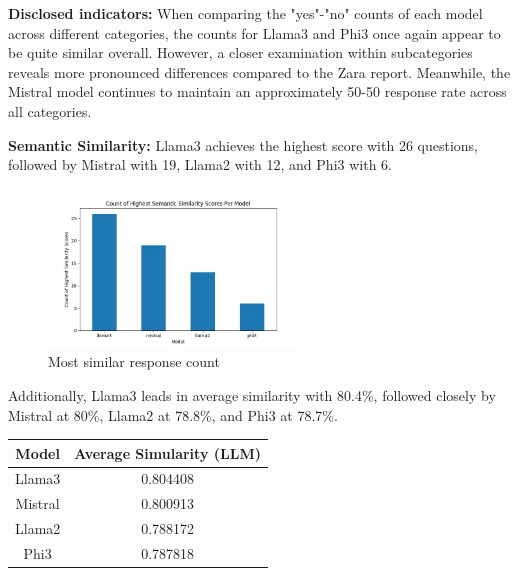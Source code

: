 \documentclass[]{article}
\begin{document}
\textbf{Disclosed indicators:} When comparing the "yes"-"no" counts of each model across different categories, 
the counts for Llama3 and Phi3 once again appear to be quite similar overall. However, 
a closer examination within subcategories reveals more pronounced differences compared to the Zara report. 
Meanwhile, the Mistral model continues to maintain an approximately 50-50 response rate across all categories.
\newline\newline

\textbf{Semantic Similarity:} 
Llama3 achieves the highest score with 26 questions, followed by Mistral with 19, Llama2 with 12, and Phi3 with 6.

\begin{figure}[H]
    \centering
    \includegraphics[width=0.6\textwidth]{./images/highest_count_hm.jpg}
    \caption{Most similar response count}
    \label{fig:image_label}
\end{figure}

Additionally, Llama3 leads in average similarity with 80.4\%, followed closely by Mistral at 80\%, Llama2 at 78.8\%, and Phi3 at 78.7\%.

\begin{center}
    \begin{tabular}{||c c||} 
     \hline
     \textbf{Model} & \textbf{Average Simularity (LLM)}  \\ [0.5ex] 
     \hline
     Llama3 &  0.804408\\
     \hline
     Mistral  & 0.800913\\
     \hline
     Llama2 & 0.788172\\
     \hline
     Phi3 &  0.787818 \\
     \hline
    \end{tabular}
\end{center}
\end{document}
